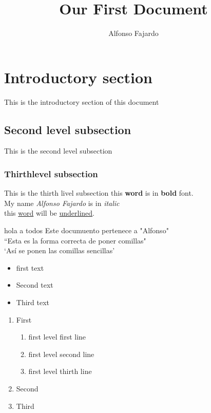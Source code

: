 \documentclass{article}
\title{Our First Document}
\author{Alfonso Fajardo}
\date{}
\begin{document}
\maketitle %
\section{Introductory section} %
This is the introductory section of this document
\subsection{Second level subsection} %
This is the second level subsection
\subsubsection{Thirthlevel subsection}
This is the thirth livel subsection
this \textbf{word} is in \textbf{bold} font. \\
My name \emph{Alfonso Fajardo} is in \emph{italic} \\
this \underline{word} will be \underline{underlined}.

\noindent hola a todos %
Este documuento pertenece a "Alfonso" \\ %
``Esta es la forma correcta de poner comillas" \\
`Así se ponen las comillas sencillas'

\begin{itemize}
\item first text
\item Second text
\item Third text
\end{itemize}

\begin{enumerate}
\item First
\begin{enumerate}
\item first level first line
\item first level second line
\item first level thirth line
\end{enumerate}
\item Second
\item Third
\end{enumerate}
\end{document}
